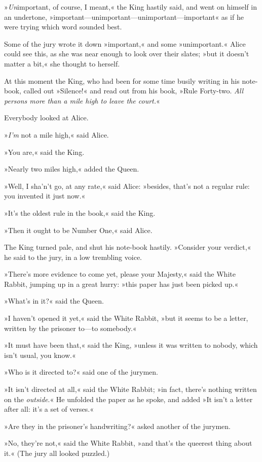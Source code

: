 »\textit{Un}important, of course, I meant,« the King hastily said, and went on himself in an undertone, »important—unimportant—unimportant—important\longdash« as if he were trying which word sounded best.

Some of the jury wrote it down »important,« and some »unimportant.« Alice could see this, as she was near enough to look over their slates; »but it doesn't matter a bit,« she thought to herself.

At this moment the King, who had been for some time busily writing in his note-book, called out »Silence!« and read out from his book, »Rule Forty-two. \textit{All persons more than a mile high to leave the court.}«

Everybody looked at Alice.

»\textit{I'm} not a mile high,« said Alice.

»You are,« said the King.

»Nearly two miles high,« added the Queen.

»Well, I sha'n't go, at any rate,« said Alice: »besides, that's not a regular rule: you invented it just now.«

»It's the oldest rule in the book,« said the King.

»Then it ought to be Number One,« said Alice.

The King turned pale, and shut his note-book hastily. »Consider your verdict,« he said to the jury, in a low trembling voice.

»There's more evidence to come yet, please your Majesty,« said the White Rabbit, jumping up in a great hurry: »this paper has just been picked up.«

»What's in it?« said the Queen.

»I haven't opened it yet,« said the White Rabbit, »but it seems to be a letter, written by the prisoner to—to somebody.«

»It must have been that,« said the King, »unless it was written to nobody, which isn't usual, you know.«

»Who is it directed to?« said one of the jurymen.

»It isn't directed at all,« said the White Rabbit; »in fact, there's nothing written on the \textit{outside}.« He unfolded the paper as he spoke, and added »It isn't a letter after all: it's a set of verses.«

»Are they in the prisoner's handwriting?« asked another of the jurymen.

»No, they're not,« said the White Rabbit, »and that's the queerest thing about it.« (The jury all looked puzzled.)


